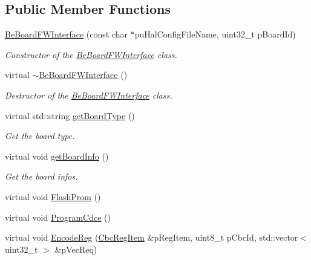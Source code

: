 \subsection*{Public Member Functions}
\begin{CompactItemize}
\item 
\hyperlink{class_ph2___hw_interface_1_1_be_board_f_w_interface_6a6be2907a3f6494422abb3ae2b35bd1}{Be\-Board\-FWInterface} (const char $\ast$pu\-Hal\-Config\-File\-Name, uint32\_\-t p\-Board\-Id)
\begin{CompactList}\small\item\em Constructor of the \hyperlink{class_ph2___hw_interface_1_1_be_board_f_w_interface}{Be\-Board\-FWInterface} class. \item\end{CompactList}\item 
virtual \hyperlink{class_ph2___hw_interface_1_1_be_board_f_w_interface_22077ee1db6eb5ae149165bff88b5fa0}{$\sim$Be\-Board\-FWInterface} ()
\begin{CompactList}\small\item\em Destructor of the \hyperlink{class_ph2___hw_interface_1_1_be_board_f_w_interface}{Be\-Board\-FWInterface} class. \item\end{CompactList}\item 
virtual std::string \hyperlink{class_ph2___hw_interface_1_1_be_board_f_w_interface_895bb5ac8dfb81a00a047a6d8f5281b2}{get\-Board\-Type} ()
\begin{CompactList}\small\item\em Get the board type. \item\end{CompactList}\item 
virtual void \hyperlink{class_ph2___hw_interface_1_1_be_board_f_w_interface_717caf9d29d3a7e92efceae18ad1dd78}{get\-Board\-Info} ()
\begin{CompactList}\small\item\em Get the board infos. \item\end{CompactList}\item 
virtual void \hyperlink{class_ph2___hw_interface_1_1_be_board_f_w_interface_d19ee1309003c559db472046af4620d5}{Flash\-Prom} ()
\item 
virtual void \hyperlink{class_ph2___hw_interface_1_1_be_board_f_w_interface_9575de192b6dd5613857ce255ec6947b}{Program\-Cdce} ()
\item 
virtual void \hyperlink{class_ph2___hw_interface_1_1_be_board_f_w_interface_094deaa5b40e98e2ea8f21c8e74c9431}{Encode\-Reg} (\hyperlink{struct_ph2___hw_description_1_1_cbc_reg_item}{Cbc\-Reg\-Item} \&p\-Reg\-Item, uint8\_\-t p\-Cbc\-Id, std::vector$<$ uint32\_\-t $>$ \&p\-Vec\-Req)

\end{CompactItemize}
